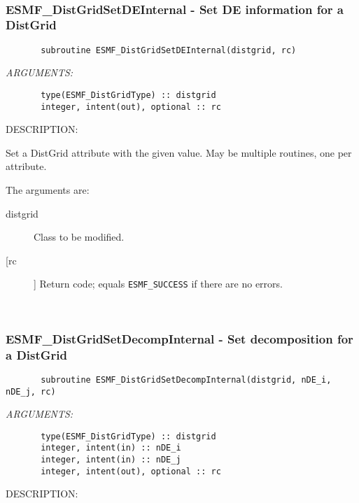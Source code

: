  
\mbox{}\hrulefill\ 
 
\subsubsection{ESMF\_DistGridSetDEInternal - Set DE information for a DistGrid}


 
\begin{verbatim}       subroutine ESMF_DistGridSetDEInternal(distgrid, rc)\end{verbatim}{\em ARGUMENTS:}
\begin{verbatim}       type(ESMF_DistGridType) :: distgrid
       integer, intent(out), optional :: rc            \end{verbatim}
{\sf DESCRIPTION:\\ }


       Set a DistGrid attribute with the given value.
       May be multiple routines, one per attribute.
  
       The arguments are:
       \begin{description}
       \item[distgrid] 
            Class to be modified.
       \item[[rc]] 
            Return code; equals {\tt ESMF\_SUCCESS} if there are no errors.
       \end{description}
   
 
\mbox{}\hrulefill\ 
 
\subsubsection{ESMF\_DistGridSetDecompInternal - Set decomposition for a DistGrid}


 
\begin{verbatim}       subroutine ESMF_DistGridSetDecompInternal(distgrid, nDE_i, nDE_j, rc)\end{verbatim}{\em ARGUMENTS:}
\begin{verbatim}       type(ESMF_DistGridType) :: distgrid
       integer, intent(in) :: nDE_i
       integer, intent(in) :: nDE_j
       integer, intent(out), optional :: rc            
 \end{verbatim}
{\sf DESCRIPTION:\\ }


